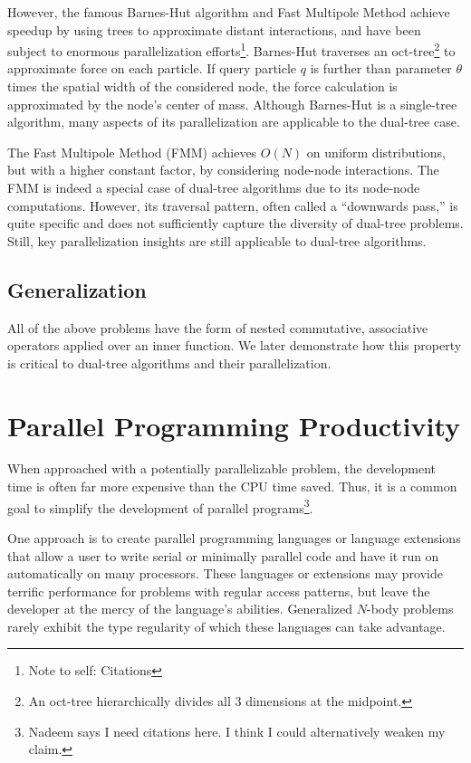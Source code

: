 \documentclass[twoside,leqno,twocolumn]{article}
\newcommand{\authornote}[1]{\footnote{Note to self: #1}}
\newcommand{\authorsnote}[1]{\authornote{#1}}
\newcommand{\mysub}[1]{\subsection{#1} }
\begin{document}
However, the famous Barnes-Hut algorithm \cite{barnes_hut} and Fast Multipole Method \cite{greengard_fmm} achieve speedup by using trees to approximate distant interactions, and have been subject to enormous parallelization efforts\authorsnote{Citations}.
Barnes-Hut \cite{barnes_hut} traverses an oct-tree\footnote{An oct-tree hierarchically divides all 3 dimensions at the midpoint.} to approximate force on each particle.
If query particle $q$ is further than parameter $\theta$ times the spatial width of the considered node, the force calculation is approximated by the node's center of mass.
Although Barnes-Hut is a single-tree algorithm, many aspects of its parallelization are applicable to the dual-tree case.

The Fast Multipole Method (FMM) \cite{greengard_fmm} achieves $O(N)$ on uniform distributions, but with a higher constant factor, by considering node-node interactions.
The FMM is indeed a special case of dual-tree algorithms due to its node-node computations.
However, its traversal pattern, often called a ``downwards pass,'' is quite specific and does not sufficiently capture the diversity of dual-tree problems.
Still, key parallelization insights are still applicable to dual-tree algorithms.

\mysub{Generalization}
All of the above problems have the form of nested commutative, associative operators applied over an inner function.
We later demonstrate how this property is critical to dual-tree algorithms and their parallelization.


\section{Parallel Programming Productivity}

When approached with a potentially parallelizable problem, the development time is often far more expensive than the CPU time saved.
Thus, it is a common goal to simplify the development of parallel programs\footnote{Nadeem says I need citations here.  I think I could alternatively weaken my claim.}.

One approach is to create parallel programming languages or language extensions that allow a user to write serial or minimally parallel code and have it run on automatically on many processors.
These languages or extensions may provide terrific performance for problems with regular access patterns, but leave the developer at the mercy of the language's abilities.
Generalized $N$-body problems rarely exhibit the type regularity of which these languages can take advantage.
\end{document}
